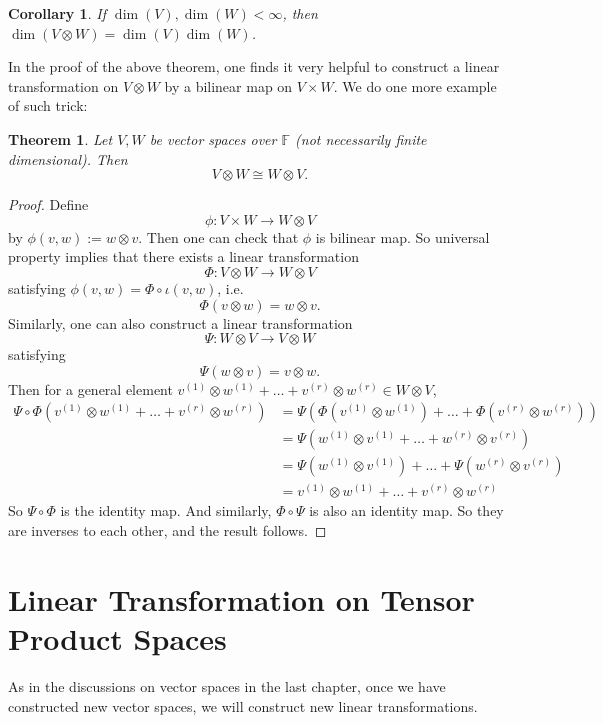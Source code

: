 \documentclass[11pt,openany]{book}
\theoremstyle{plain}
\newtheorem{theorem}{Theorem}[chapter]
\newtheorem{corollary}[corollary]{Corollary}
\theoremstyle{definition}
\theoremstyle{remark}
\begin{document}
\begin{corollary}
If $\dim(V), \dim(W) < \infty$, then $\dim(V \otimes W) = \dim(V)\dim(W)$.
\end{corollary}

In the proof of the above theorem, one finds it very helpful to construct a linear transformation on $V \otimes W$ by a bilinear map on $V \times W$.
We do one more example of such trick:

\begin{theorem}
    Let $V, W$ be vector spaces over $\mathbb{F}$ (not necessarily finite dimensional). Then 
    $$V \otimes W \cong W \otimes V.$$
\end{theorem}
\begin{proof}
    Define
$$\phi : V \times W \to W \otimes  V$$
by $\phi(v,w) := w \otimes v$. Then one can check that $\phi$ is bilinear map. So universal property implies that there exists a linear transformation
$$ \Phi : V \otimes W \to  W \otimes  V$$
satisfying $\phi(v,w) = \Phi \circ \iota(v,w)$, i.e.
$$\Phi(v \otimes w) = w \otimes v.$$
Similarly, one can also construct a linear transformation $$\Psi: W \otimes V \to V \otimes W$$ satisfying
$$\Psi(w \otimes v) = v \otimes w.$$
Then for a general element $v^{(1)} \otimes w^{(1)} + \dots + v^{(r)} \otimes w^{(r)} \in W \otimes V$,
\begin{align*}
\Psi \circ \Phi(v^{(1)} \otimes w^{(1)}+ \dots + v^{(r)} \otimes w^{(r)})
&= \Psi (\Phi(v^{(1)} \otimes w^{(1)})+ \dots + \Phi(v^{(r)} \otimes w^{(r)})) \\
&= \Psi (w^{(1)} \otimes v^{(1)}+ \dots + w^{(r)} \otimes v^{(r)}) \\
&= \Psi(w^{(1)} \otimes v^{(1)})+ \dots + \Psi(w^{(r)} \otimes v^{(r)}) \\ 
&= v^{(1)} \otimes w^{(1)}+ \dots + v^{(r)} \otimes w^{(r)}
\end{align*}
So $\Psi \circ \Phi$ is the identity map. And similarly, $\Phi \circ \Psi$
is also an identity map. So they are inverses to each other, and the result follows.
\end{proof}

\section{Linear Transformation on Tensor Product Spaces}
As in the discussions on vector spaces in the last chapter, once we have constructed new vector spaces, we will construct new linear transformations.
\end{document}

